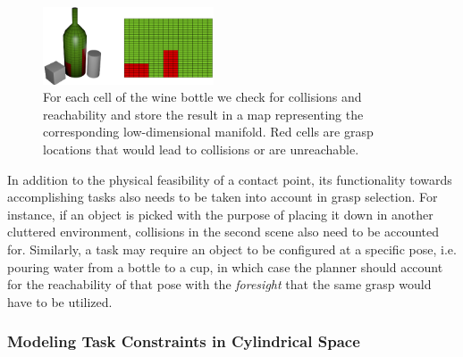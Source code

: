 \documentclass[a4paper,10pt,twocolumn]{article}
\begin{document}
\begin{figure}[t]
  \begin{center}
    \includegraphics[width=0.45\textwidth]{./images/bottlemapping.png} \quad
  \end{center}
  \caption{For each cell of the wine bottle we check for collisions and reachability and store the result in a map representing the corresponding low-dimensional manifold. Red cells are grasp locations that would lead to collisions or are unreachable.}
  \label{fig:bottlemapping} 
\end{figure}
In addition to the physical feasibility of a contact point, its functionality towards accomplishing tasks also needs to be taken into account in grasp selection. For instance, if an object is picked with the purpose of
placing it down in another cluttered environment, collisions in the second scene also need to be accounted for. Similarly, a task may require an object to be configured at a specific pose, i.e. pouring water from a bottle to a cup, in which case the planner should account for the reachability of
that pose with the \textit{foresight} that the same grasp would have to be utilized. 

\subsubsection{Modeling Task Constraints in Cylindrical Space}
\end{document}
